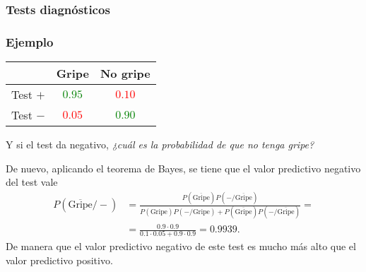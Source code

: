 \begin{frame}
\frametitle{Tests diagnósticos}
\frametitle{Ejemplo}
\begin{center}
\begin{tabular}{|c|c|c|}
\cline{2-3}
\multicolumn{1}{c|}{} & Gripe & No gripe\\ \hline
Test $+$ & \textcolor{green}{$0.95$} & \textcolor{red}{$0.10$}\\ \hline
Test $-$ & \textcolor{red}{$0.05$} & \textcolor{green}{$0.90$}\\ \hline
\end{tabular}
\end{center}

Y si el test da negativo, \emph{¿cuál es la probabilidad de que no tenga gripe?}

De nuevo, aplicando el teorema de Bayes, se tiene que el valor predictivo negativo del test vale
\begin{align*}
P(\overline{\mbox{Gripe}}/-) &=
\frac{P(\overline{\mbox{Gripe}})P(-/\overline{\mbox{Gripe}})}{P(\mbox{Gripe})P(-/\mbox{Gripe})+P(\overline{\mbox{Gripe}})P(-/\overline{\mbox{Gripe}})}
=\\ &= \frac{0.9\cdot 0.9}{0.1\cdot 0.05+0.9\cdot 0.9} = 0.9939.
\end{align*}
De manera que el valor predictivo negativo de este test es mucho más alto que el valor predictivo positivo.

\end{frame}

